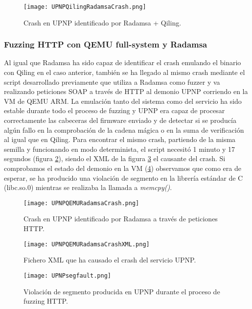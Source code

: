 \begin{figure}[H]
    \centering
    \texttt{[image: UPNPQilingRadamsaCrash.png]}
    \caption{Crash en UPNP identificado por Radamsa + Qiling.}
    \label{fig:UPNPQilingRadamsaCrash}
\end{figure}

\subsubsection{Fuzzing HTTP con QEMU full-system y Radamsa}
Al igual que Radamsa ha sido capaz de identificar el crash emulando el binario con Qiling en el caso anterior, también se ha llegado al mismo 
crash mediante el script desarrollado previamente que utiliza a Radamsa como fuzzer y va realizando peticiones SOAP a través de HTTP al 
demonio UPNP corriendo en la VM de QEMU ARM. La emulación tanto del sistema como del servicio ha sido estable durante todo el proceso de
fuzzing y UPNP era capaz de procesar correctamente las cabeceras del firmware enviado y de detectar si se producía algún fallo en la comprobación
de la cadena mágica o en la suma de verificación al igual que en Qiling. Para encontrar el mismo crash, partiendo de la misma semilla y funcionando en modo 
determinista, el script necesitó 1 minuto y 17 segundos (figura \ref{fig:UPNPQEMURadamsaCrash}), siendo el XML de la figura \ref{fig:UPNPQEMURadamsaCrashXML}
el causante del crash. Si comprobamos el estado del demonio en la VM (\ref{fig:UPNPsegfault}) observamos que como era de esperar, se ha producido una violación de segmento
en la librería estándar de C (libc.so.0) mientras se realizaba la llamada a \textit{memcpy()}.

\begin{figure}[H]
    \centering
    \texttt{[image: UPNPQEMURadamsaCrash.png]}
    \caption{Crash en UPNP identificado por Radamsa a través de peticiones HTTP.}
    \label{fig:UPNPQEMURadamsaCrash}
\end{figure}

\begin{figure}[H]
    \centering
    \texttt{[image: UPNPQEMURadamsaCrashXML.png]}
    \caption{Fichero XML que ha causado el crash del servicio UPNP.}
    \label{fig:UPNPQEMURadamsaCrashXML}
\end{figure}

\begin{figure}[H]
    \centering
    \texttt{[image: UPNPsegfault.png]}
    \caption{Violación de segmento producida en UPNP durante el proceso de fuzzing HTTP.}
    \label{fig:UPNPsegfault}
\end{figure}


